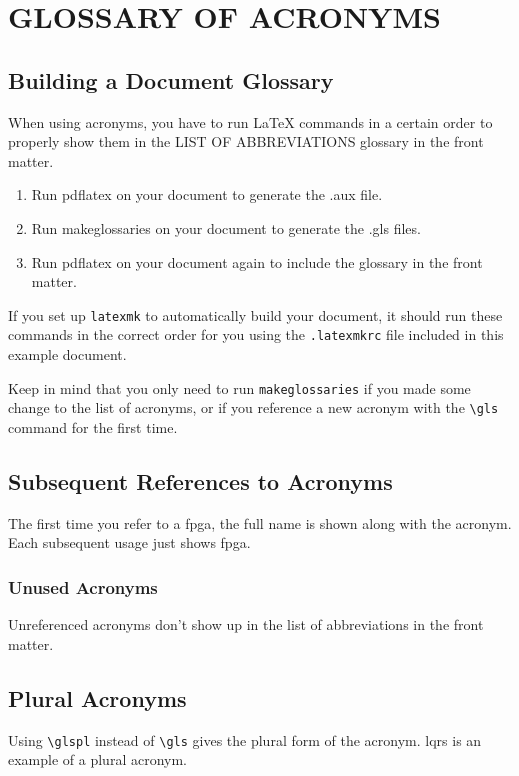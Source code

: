 
\chapter{GLOSSARY OF ACRONYMS}

\section{Building a Document Glossary}
  When using acronyms, you have to run LaTeX commands in a certain order to properly show them in the LIST OF ABBREVIATIONS glossary in the front matter.
  \begin{enumerate}
    \item Run pdflatex on your document to generate the .aux file.
    \item Run makeglossaries on your document to generate the .gls files.
    \item Run pdflatex on your document again to include the glossary in the front matter.
  \end{enumerate}
  If you set up \texttt{latexmk} to automatically build your document, it should run these commands in the correct order for you using the \texttt{.latexmkrc} file included in this example document.

  Keep in mind that you only need to run \texttt{makeglossaries} if you made some change to the list of acronyms, or if you reference a new acronym with the \verb|\gls| command for the first time.

\section{Subsequent References to Acronyms}
  The first time you refer to a \gls{fpga}, the full name is shown along with the acronym.
  Each subsequent usage just shows \gls{fpga}.

\subsection{Unused Acronyms}
  Unreferenced acronyms don't show up in the list of abbreviations in the front matter.

\section{Plural Acronyms}
  Using \verb|\glspl| instead of \verb|\gls| gives the plural form of the acronym.
  \glspl{lqr} is an example of a plural acronym.